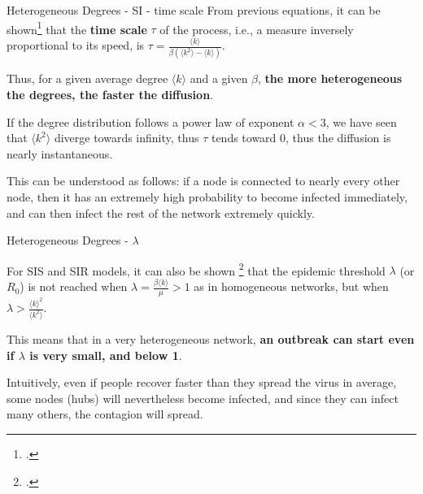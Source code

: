 \begin{textbox}{Heterogeneous Degrees - SI - time scale}
    From previous equations, it can be shown\footcite{barrat2008dynamical} that the \textbf{time scale} $\tau$ of the process, i.e., a measure inversely proportional to its speed, is $\tau=\frac{\langle k \rangle}{\beta(\langle k^2 \rangle - \langle k \rangle)}$.

    Thus, for a given average degree $\langle k \rangle$ and a given $\beta$, \textbf{the more heterogeneous the degrees, the faster the diffusion}.

    If the degree distribution follows a power law of exponent $\alpha<3$, we have seen that $\langle k^2 \rangle$ diverge towards infinity, thus $\tau$ tends toward 0, thus the diffusion is nearly instantaneous.

    This can be understood as follows: if a node is connected to nearly every other node, then it has an extremely high probability to become infected immediately, and can then infect the rest of the network extremely quickly.
\end{textbox}


\begin{textbox}{Heterogeneous Degrees - $\lambda$}

    For SIS and SIR models, it can also be shown \footcite{barrat2008dynamical} that the epidemic threshold $\lambda$ (or $R_0$) is not reached when $\lambda=\frac{\beta\langle k \rangle}{\mu}>1$ as in homogeneous networks, but when $\lambda >\frac{\langle k \rangle^2}{\langle k^2 \rangle}$.

    This means that in a very heterogeneous network, \textbf{an outbreak can start even if $\lambda$ is very small, and below 1}.

    Intuitively, even if people recover faster than they spread the virus in average, some nodes (hubs) will nevertheless become infected, and since they can infect many others, the contagion will spread.

\end{textbox}





